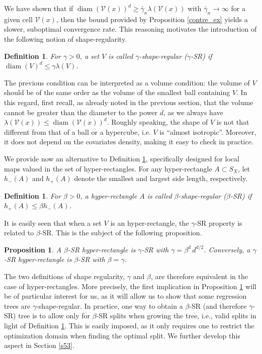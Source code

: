 \documentclass[paper=a4, fontsize=11pt]{scrartcl}
\newcommand{\diam}{\operatorname{diam}}
\newtheorem{definition}[theorem]{Definition}
\newtheorem{proposition}[theorem]{Proposition}
\begin{document}
We have shown that if $\diam(\mathcal{V}(x))^d \geq \bar{\gamma}_n\lambda(\mathcal{V}(x))$ with $\bar{\gamma}_n\to \infty$ for a given cell $\mathcal{V}(x)$, then the bound provided by Proposition \ref{contre_ex} yields a slower, suboptimal convergence rate. This reasoning motivates the introduction of the following notion of shape-regularity.


\begin{definition}\label{def:gamma_regular}
For $\gamma>0 $, a set $ V $ is called $\gamma$-shape-regular ($\gamma$-SR) if
$\diam(V)^d \leq \gamma \lambda (V)$.
\end{definition}

\noindent The previous condition can be interpreted as a volume condition: the volume of $V$ should be of the same order as the volume of the smallest ball containing $V$. In this regard, first recall, as already noted in the previous section, that the volume cannot be greater than the diameter to the power $d$, as we always have $ \lambda (\mathcal V(x) ) \leq \diam ( \mathcal V(x) )^d$. Roughly speaking, the shape of $V$ is not that different from that of a ball or a hypercube, i.e. $V$ is ``almost isotropic''. Moreover, it does not depend on the covariates density, making it easy to check in practice. 
 
We provide now an alternative to Definition \ref{def:gamma_regular}, specifically designed for local maps valued in the set of hyper-rectangles. %
For any hyper-rectangle $A\subset  S_X$, let $h_-(A)$ and $h_+(A)$ denote the smallest and largest side length, respectively.
\begin{definition}\label{def:beta_regular}
For $\beta>0 $, a hyper-rectangle $ A$ is called $\beta$-shape-regular ($\beta$-SR) if 
$ h_+ (A)  \leq \beta h_-(A)$.
\end{definition}
\noindent It is easily seen that when a set $V$ is an hyper-rectangle, the $\gamma$-SR property is related to $\beta$-SR. This is the subject of the following proposition. 
\begin{proposition}\label{link_beta_gamma}
     A $\beta$-SR hyper-rectangle  is $\gamma$-SR with $\gamma = \beta^d \, d^{d/2}$. Conversely, a $\gamma$-SR hyper-rectangle  is $\beta$-SR with $\beta= \gamma$.
\end{proposition}
\noindent The two definitions of shape regularity, $\gamma$ and $\beta$, are therefore equivalent in the case of hyper-rectangles. More precisely, the first implication in Proposition \ref{link_beta_gamma} will be of particular interest for us, as it will allow us to show that some regression trees are $\gamma$-shape-regular. In practice, one way to obtain a $\beta$-SR (and therefore $\gamma$-SR) tree is to allow only for $\beta$-SR splits when growing the tree, i.e., valid splits in light of Definition \ref{def:beta_regular}. This is easily imposed, as it only requires one to restrict the  optimization domain when finding the optimal split. We further develop this aspect in Section \ref{s53}.
\end{document}

